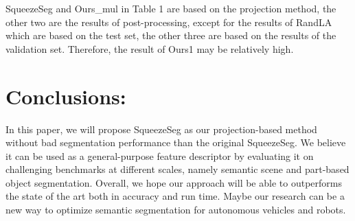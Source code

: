 \documentclass{article}
\begin{document}
\begin{normalsize}
        SqueezeSeg and Ours\_mul in Table 1 are based on the projection method, the other two are the results of post-processing, except for the results of RandLA which are based on the test set, the other three are based on the results of the validation set. Therefore, the result of Ours1 may be relatively high.
        

       \section{Conclusions:}
        In this paper, we will propose SqueezeSeg as our projection-based method without bad segmentation performance than the original SqueezeSeg. We believe it can be used as a general-purpose feature descriptor by evaluating it on challenging benchmarks at different scales, namely semantic scene and part-based object segmentation. Overall, we hope our approach will be able to outperforms the state of the art both in accuracy and run time. Maybe our research can be a new way to optimize semantic segmentation for autonomous vehicles and robots. 
        
    

\end{normalsize}
 
 
\end{document}
